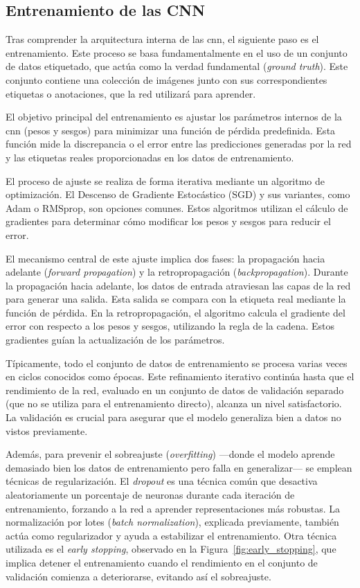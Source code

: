 \documentclass[11pt,spanish,listoffigures,listoftables]{tfgetsinf}
\begin{document}
\subsection{Entrenamiento de las CNN} \label{sec:entrenamiento_cnn}


Tras comprender la arquitectura interna de las \gls{cnn}, el siguiente paso es el entrenamiento. Este proceso se basa fundamentalmente en el uso de un conjunto de datos etiquetado, que actúa como la verdad fundamental (\textit{ground truth}). Este conjunto contiene una colección de imágenes junto con sus correspondientes etiquetas o anotaciones, que la red utilizará para aprender.

El objetivo principal del entrenamiento es ajustar los parámetros internos de la \gls{cnn} (pesos y sesgos) para minimizar una función de pérdida predefinida. Esta función mide la discrepancia o el error entre las predicciones generadas por la red y las etiquetas reales proporcionadas en los datos de entrenamiento.

El proceso de ajuste se realiza de forma iterativa mediante un algoritmo de optimización. El Descenso de Gradiente Estocástico (SGD) y sus variantes, como Adam o RMSprop, son opciones comunes. Estos algoritmos utilizan el cálculo de gradientes para determinar cómo modificar los pesos y sesgos para reducir el error.

El mecanismo central de este ajuste implica dos fases: la propagación hacia adelante (\textit{forward propagation}) y la retropropagación (\textit{backpropagation}). Durante la propagación hacia adelante, los datos de entrada atraviesan las capas de la red para generar una salida. Esta salida se compara con la etiqueta real mediante la función de pérdida. En la retropropagación, el algoritmo calcula el gradiente del error con respecto a los pesos y sesgos, utilizando la regla de la cadena. Estos gradientes guían la actualización de los parámetros.

Típicamente, todo el conjunto de datos de entrenamiento se procesa varias veces en ciclos conocidos como épocas. Este refinamiento iterativo continúa hasta que el rendimiento de la red, evaluado en un conjunto de datos de validación separado (que no se utiliza para el entrenamiento directo), alcanza un nivel satisfactorio. La validación es crucial para asegurar que el modelo generaliza bien a datos no vistos previamente.

Además, para prevenir el sobreajuste (\textit{overfitting}) —donde el modelo aprende demasiado bien los datos de entrenamiento pero falla en generalizar— se emplean técnicas de regularización. El \textit{dropout} es una técnica común que desactiva aleatoriamente un porcentaje de neuronas durante cada iteración de entrenamiento, forzando a la red a aprender representaciones más robustas. La normalización por lotes (\textit{batch normalization}), explicada previamente, también actúa como regularizador y ayuda a estabilizar el entrenamiento. Otra técnica utilizada es el \textit{early stopping}, observado en la Figura~\ref{fig:early_stopping}, que implica detener el entrenamiento cuando el rendimiento en el conjunto de validación comienza a deteriorarse, evitando así el sobreajuste.
\end{document}
